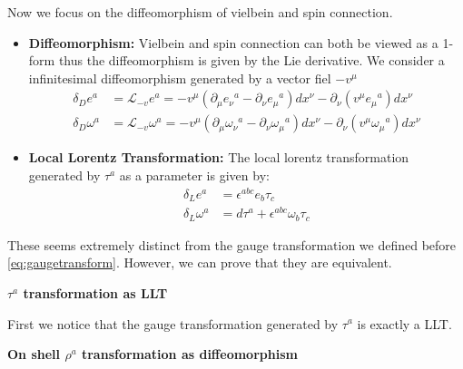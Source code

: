 Now we focus on the diffeomorphism of vielbein and spin connection.
\begin{itemize}
  \item \textbf{Diffeomorphism:}
    Vielbein and spin connection can both be viewed as a 1-form thus the
    diffeomorphism is given
    by the Lie derivative. We consider a infinitesimal diffeomorphism
    generated by a vector fiel $ -v^\mu $
    \begin{align}
      \delta_D e^a & = \mathcal{L}_{- v} e^a = - v^\mu
      (\partial_{\mu} e_\nu{}^a - \partial_\nu e_\mu{}^a) dx^\nu -
      \partial_\nu (v^\mu e_\mu{}^a) dx^\nu \\
      \delta_D \omega^a & = \mathcal{L}_{- v} \omega^a = - v^\mu
      (\partial_{\mu} \omega_\nu{}^a - \partial_\nu \omega_\mu{}^a) dx^\nu -
      \partial_\nu (v^\mu \omega_\mu{}^a) dx^\nu
    \end{align}
  \item \textbf{Local Lorentz Transformation:} The local lorentz
    transformation generated by $ \tau^a $ as a parameter is given by:
    \begin{align}
      \delta_L e^a & = \epsilon^{abc} e_b \tau_c \\
      \delta_L \omega^a & = d\tau^a + \epsilon^{abc} \omega_b
      \tau_c
    \end{align}
\end{itemize}
These seems extremely distinct from the gauge transformation we
defined before \cref{eq:gaugetransform}. However, we can prove that
they are equivalent.

\bigskip
\textbf{$ \tau^a$ transformation as LLT}

First we notice that the gauge transformation generated by $ \tau^a $
is exactly a LLT.

\bigskip
\textbf{On shell $ \rho^a $ transformation as diffeomorphism}

